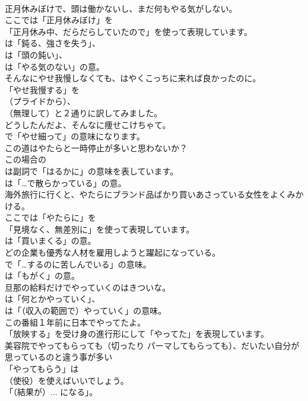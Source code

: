 \documentclass[8pt]{extreport}
\begin{document}
\begin{CJK}{UTF8}{min}
\\	正月休みぼけで、頭は働かないし、まだ何もやる気がしない。 
\\	ここでは「正月休みぼけ」を
\\	「正月休み中、だらだらしていたので」を使って表現しています。
\\	は「鈍る、強さを失う」、
\\	は「頭の鈍い」、
\\	は「やる気のない」の意。	
\\	そんなにやせ我慢しなくても、はやくこっちに来れば良かったのに。 
\\	「やせ我慢する」を
\\	（プライドから）、
\\	（無理して）と２通りに訳してみました。	
\\	どうしたんだよ、そんなに痩せこけちゃて。 
\\	で「やせ細って」の意味になります。	
\\	この道はやたらと一時停止が多いと思わないか？ 
\\	この場合の 
\\	は副詞で「はるかに」の意味を表しています。
\\	は「…で散らかっている」の意。	
\\	海外旅行に行くと、やたらにブランド品ばかり買いあさっている女性をよくみかける。 
\\	ここでは「やたらに」を
\\	「見境なく、無差別に」を使って表現しています。
\\	は「買いまくる」の意。	
\\	どの企業も優秀な人材を雇用しようと躍起になっている。 
\\	で「…するのに苦しんでいる」の意味。
\\	は「もがく」の意。	
\\	旦那の給料だけでやっていくのはきついな。 
\\	は「何とかやっていく」、
\\	は「（収入の範囲で）やっていく」の意味。	
\\	この番組１年前に日本でやってたよ。 
\\	「放映する」を受け身の進行形にして「やってた」を表現しています。	
\\	美容院でやってもらっても（切ったり パーマしてもらっても）、だいたい自分が思っているのと違う事が多い 
\\	「やってもらう」は
\\	（使役）を使えばいいでしょう。
\\	「（結果が）... になる」。	

\end{CJK}
\end{document}
